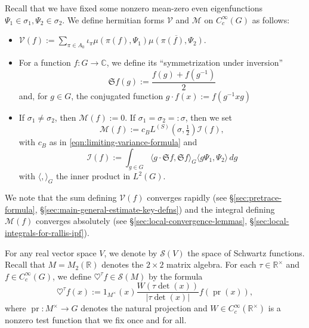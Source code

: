\documentclass[reqno,10pt]{amsart}
\theoremstyle{plain} %
\theoremstyle{definition}
\theoremstyle{plain} %
\theoremstyle{remark}
\theoremstyle{itplain} %
\theoremstyle{remark} %
\numberwithin{equation}{section}
\DeclareMathOperator{\pr}{pr}
\begin{document}
Recall that we have fixed some nonzero mean-zero even eigenfunctions $\Psi_1 \in \sigma_1, \Psi_2 \in \sigma_2$.  We define hermitian forms $\mathcal{V}$ and $\mathcal{M}$ on $C_c^\infty(G)$ as follows:
\begin{itemize}
\item $\mathcal{V}(f) := \sum_{\pi \in A_0} \iota_{\pi} \mu(\pi(f),\Psi_1) \overline{\mu(\pi(f),\Psi_2)}$.
\item For a function $f : G \rightarrow \mathbb{C}$, we define its ``symmetrization under inversion''
  \begin{equation*}
    \mathfrak{S} f(g) := \frac{f(g) + f(g^{-1})}{2}
  \end{equation*}
  and, for $g \in G$, the conjugated function $g \cdot f(x) := f(g^{-1} x g)$
\item If $\sigma_1 \neq \sigma_2$, then $\mathcal{M}(f) := 0$.  If $\sigma_1 = \sigma_2 =: \sigma$, then we set
  \begin{equation*}
    \mathcal{M}(f) := c_B L^{(S)}(\sigma,\tfrac{1}{2}) \mathcal{I}(f),
  \end{equation*}
  with $c_B$ as in \eqref{eqn:limiting-variance-formula} and
  \begin{equation*}
    \mathcal{I}(f) := \int_{g \in G} \langle g \cdot \mathfrak{S} f, \mathfrak{S} f \rangle_{G} \langle g \Psi_1, \Psi_2 \rangle \,d g 
  \end{equation*}
  with $\langle , \rangle_G$ the inner product in $L^2(G)$.
\end{itemize}
We note that the sum defining $\mathcal{V}(f)$ converges rapidly (see \S\ref{sec:pretrace-formula}, \S\ref{sec:main-general-estimate-key-defns}) and the integral defining $\mathcal{M}(f)$ converges absolutely (see \S\ref{sec:local-convergence-lemmas}, \S\ref{sec:local-integrals-for-rallis-ipf}).

For any real vector space $V$, we denote by $\mathcal{S}(V)$ the space of Schwartz functions.  Recall that $M = M_2(\mathbb{R})$ denotes the $2 \times 2$ matrix algebra.  For each $\tau \in \mathbb{R}^\times$ and $f \in C_c^\infty(G)$, we define $\heartsuit^{\tau} f \in \mathcal{S}(M)$ by the formula
\[
  \heartsuit^{\tau} f(x) := 1_{M^\times}(x) \frac{W(\tau \det(x))}{|\tau \det(x)|} f(\pr(x)),
\]
where $\pr : M^\times \rightarrow G$ denotes the natural projection and $W \in C_c^\infty(\mathbb{R}^\times)$ is a nonzero test function that we fix once and for all.
\end{document}
